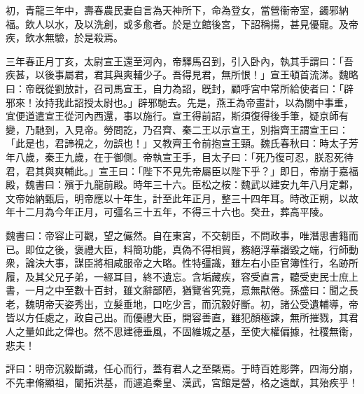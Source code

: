 \begin{pinyinscope}
初，青龍三年中，壽春農民妻自言為天神所下，命為登女，當營衞帝室，蠲邪納福。飲人以水，及以洗創，或多愈者。於是立館後宮，下詔稱揚，甚見優寵。及帝疾，飲水無驗，於是殺焉。

三年春正月丁亥，太尉宣王還至河內，帝驛馬召到，引入卧內，執其手謂曰：「吾疾甚，以後事屬君，君其與爽輔少子。吾得見君，無所恨！」宣王頓首流涕。魏略曰：帝旣從劉放計，召司馬宣王，自力為詔，旣封，顧呼宮中常所給使者曰：「辟邪來！汝持我此詔授太尉也。」辟邪馳去。先是，燕王為帝畫計，以為關中事重，宜便道遣宣王從河內西還，事以施行。宣王得前詔，斯須復得後手筆，疑京師有變，乃馳到，入見帝。勞問訖，乃召齊、秦二王以示宣王，別指齊王謂宣王曰：「此是也，君諦視之，勿誤也！」又教齊王令前抱宣王頸。魏氏春秋曰：時太子芳年八歲，秦王九歲，在于御側。帝執宣王手，目太子曰：「死乃復可忍，朕忍死待君，君其與爽輔此。」宣王曰：「陛下不見先帝屬臣以陛下乎？」即日，帝崩于嘉福殿，魏書曰：殯于九龍前殿。時年三十六。臣松之桉：魏武以建安九年八月定鄴，文帝始納甄后，明帝應以十年生，計至此年正月，整三十四年耳。時改正朔，以故年十二月為今年正月，可彊名三十五年，不得三十六也。癸丑，葬高平陵。

魏書曰：帝容止可觀，望之儼然。自在東宮，不交朝臣，不問政事，唯潛思書籍而已。即位之後，褒禮大臣，料簡功能，真偽不得相貿，務絕浮華譖毀之端，行師動衆，論決大事，謀臣將相咸服帝之大略。性特彊識，雖左右小臣官簿性行，名跡所履，及其父兄子弟，一經耳目，終不遺忘。含垢藏疾，容受直言，聽受吏民士庶上書，一月之中至數十百封，雖文辭鄙陋，猶覽省究竟，意無猒倦。孫盛曰：聞之長老，魏明帝天姿秀出，立髮垂地，口吃少言，而沉毅好斷。初，諸公受遺輔導，帝皆以方任處之，政自己出。而優禮大臣，開容善直，雖犯顏極諫，無所摧戮，其君人之量如此之偉也。然不思建德垂風，不固維城之基，至使大權偏據，社稷無衞，悲夫！

評曰：明帝沉毅斷識，任心而行，蓋有君人之至槩焉。于時百姓彫弊，四海分崩，不先聿脩顯祖，闡拓洪基，而遽追秦皇、漢武，宮館是營，格之遠猷，其殆疾乎！


\end{pinyinscope}